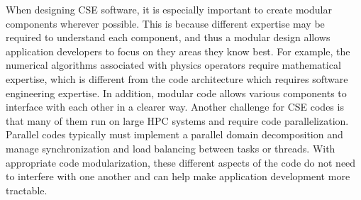 
When designing CSE software, it is especially important to create
modular components wherever possible.  This is because different expertise may be required to understand
each component, and thus a modular design allows application
developers to focus on they areas they know best. For example, the
numerical algorithms associated with physics operators require mathematical expertise, which is
different from the code architecture which requires software
engineering expertise. In addition, modular code allows various
components to interface with each other in a clearer way.  Another
challenge for CSE codes is that many of them run on large HPC systems and require code parallelization.  Parallel codes typically must implement a parallel domain decomposition and manage synchronization and load balancing between tasks or threads.  With appropriate code modularization, these different aspects of the code do not need to interfere with one another and can help make application development more tractable.



